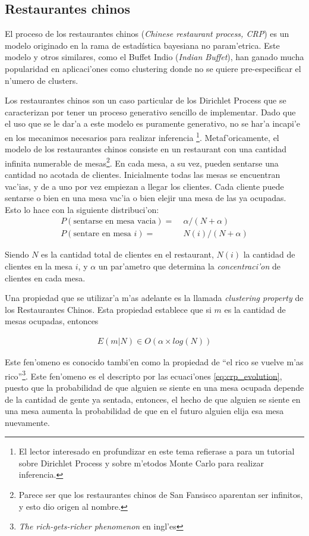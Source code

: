 \subsection{Restaurantes chinos}
El proceso de los restaurantes chinos (\emph{Chinese restaurant process, CRP}) es un modelo originado en la rama de estad\'istica bayesiana no param'etrica.
Este modelo y otros similares, como el Buffet Indio (\emph{Indian Buffet}), han ganado mucha popularidad en aplicaci'ones como clustering donde no se quiere
pre-especificar el n'umero de clusters.

Los restaurantes chinos son un caso particular de los Dirichlet Process que se caracterizan por tener un proceso generativo sencillo de implementar.
Dado que el uso que se le dar'a a este modelo es puramente generativo, no se har'a incapi'e en los mecanimos necesarios para realizar inferencia
\footnote{El lector interesado en profundizar en este tema refierase a \cite{Teh2007} para un tutorial sobre Dirichlet Process y \cite{neal2000markov} sobre m'etodos Monte Carlo para realizar inferencia.}.
Metaf'oricamente, el modelo de los restaurantes chinos consiste en un restaurant con una cantidad infinita numerable de mesas\footnote{Parece ser que los restaurantes chinos de San Fansisco aparentan ser infinitos, y esto dio origen al nombre.}. 
En cada mesa, a su vez, pueden sentarse una cantidad no acotada de clientes. Inicialmente todas las mesas se encuentran vac'ias, 
y de a uno por vez empiezan a llegar los clientes. Cada cliente puede sentarse o bien en una mesa vac'ia o bien elejir una mesa de las ya ocupadas. 
Esto lo hace con la siguiente distribuci'on:
\begin{align}
\label{eq:crp_evolution}
P(\text{sentarse en mesa vacia}) =&\; \alpha/(N + \alpha)\\
P(\text{sentare en mesa } i) =&\; N(i)/(N + \alpha)
\end{align}

Siendo $N$ es la cantidad total de clientes en el restaurant, $N(i)$ la cantidad de clientes en la mesa $i$, y $\alpha$ un 
par'ametro que determina la \emph{concentraci'on} de clientes en cada mesa. 

Una propiedad que se utilizar'a m'as adelante es la llamada \emph{clustering property} de los Restaurantes Chinos.
Esta propiedad establece que si $m$ es la cantidad de mesas ocupadas, entonces

\begin{align}
\label{eq:crp_clustering}
E(m|N) \in O(\alpha\times log(N))
\end{align}

Este fen'omeno es conocido tambi'en como la propiedad de ``el rico se vuelve m'as rico''\footnote{\emph{The rich-gets-richer phenomenon} en ingl'es}. Este fen'omeno es el descripto por
las ecuaci'ones \ref{eq:crp_evolution}, puesto que la probabilidad de que alguien se siente en una mesa ocupada depende de la cantidad de gente ya sentada, entonces, el hecho
de que alguien se siente en una mesa aumenta la probabilidad de que en el futuro alguien elija esa mesa nuevamente.
